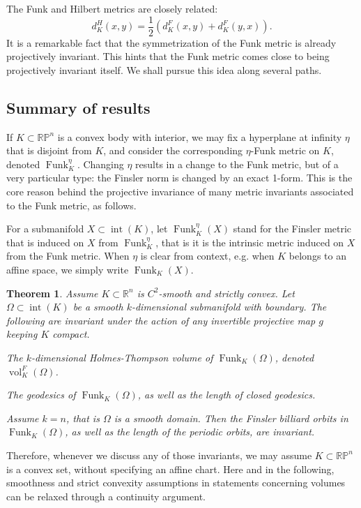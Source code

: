 \documentclass[reqno,10pt]{amsart}
\newcommand{\blue}{}
\newcounter{mt}
\newcounter{mp}
\newtheorem{MainTheorem}[mt]{Theorem}
\DeclareMathOperator{\inter}{int}
\DeclareMathOperator{\vol}{vol}
\DeclareMathOperator{\Funk}{Funk}
\newcommand{\R}{\mathbb{R}}
\newcommand{\PP}{\mathbb{P}}
\begin{document}
	The Funk and Hilbert metrics are closely related: $$d^H_K(x,y)=\frac12(d^F_K(x,y)+d^{F}_K(y,x)).$$ It is a remarkable fact that the symmetrization of the Funk metric is already projectively invariant. This hints that the Funk metric comes close to being projectively invariant itself. We shall pursue this idea along several paths.
	
		\subsection{Summary of results}

	If $K\subset\R\PP^n$ is a convex body with interior, we may fix a hyperplane at infinity $\eta$ that is disjoint from $K$, and consider the corresponding $\eta$-Funk metric on $K$, denoted $\Funk_K^\eta$. Changing $\eta$ results in a change to the Funk metric, but of a very particular type: the Finsler norm is changed by an exact 1-form. This is the core reason behind the projective invariance of many metric invariants associated to the Funk metric, as follows.	
	
	For a submanifold $X\subset \inter(K)$, let $\Funk^\eta_K(X)$ stand for the Finsler metric that is induced on $X$ from $\Funk_K^\eta$, that is it is the intrinsic metric induced on $X$ from the Funk metric.  When $\eta$ is clear from context, e.g. when $K$ belongs to an affine space, we simply write $\Funk_K(X)$.
	
	
	\begin{MainTheorem}\label{main:projective_invariants}
		 Assume $K\subset \R^n$ is $C^2$-smooth and strictly convex. Let $\Omega\subset \inter(K)$ be a smooth $k$-dimensional submanifold with boundary. The following are invariant under the action of any invertible projective map $g$ keeping $K$ compact.
	\begin{enumerate}
	{\blue 	\item The $k$-dimensional Holmes-Thompson volume of $\Funk_K(\Omega)$, denoted $\vol^{F}_K(\Omega)$.
		\item The geodesics of $\Funk_K(\Omega)$, as well as the length of closed geodesics. 
		\item Assume $k=n$, that is $\Omega$ is a smooth domain. Then the Finsler billiard orbits in $\Funk_K(\Omega)$, as well as the length of the periodic orbits, are invariant.}
	
	\end{enumerate}
	\end{MainTheorem}

Therefore, whenever we discuss any of those invariants, we may assume $K\subset\R\PP^n$ is a convex set, without specifying an affine chart. Here and in the following, smoothness and strict convexity assumptions in statements concerning volumes can be relaxed through a continuity argument.
\end{document}
